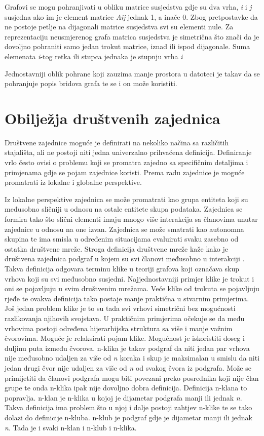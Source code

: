 Grafovi se mogu pohranjivati u obliku matrice susjedstva gdje su dva vrha, \textit{i} i \textit{j} susjedna ako im je element matrice \textit{A{ij}} jednak 1, a inače 0. Zbog pretpostavke da ne postoje petlje na dijagonali matrice susjedstva svi su elementi nule. Za reprezentaciju neusmjerenog grafa matrica susjedstva je simetrična što znači da je dovoljno pohraniti samo jedan trokut matrice, iznad ili ispod dijagonale. Suma elemenata \textit{i}-tog retka ili stupca jednaka je stupnju vrha \textit{i}

Jednostavniji oblik pohrane koji zauzima manje prostora u datoteci je takav da se pohranjuje popis bridova grafa te se i on može koristiti.


\section{Obilježja društvenih zajednica} 

Društvene zajednice moguće je definirati na nekoliko načina sa različitih stajališta, ali ne postoji niti jedna univerzalno prihvaćena definicija. Definiranje vrlo često ovisi o problemu koji se promatra zajedno sa specifičnim detaljima i primjenama gdje se pojam zajednice koristi. Prema radu \cite{fortunato2010community} zajednice je moguće promatrati iz lokalne i globalne perspektive.

Iz lokalne perspektive zajednica se može promatrati kao grupa entiteta koji su međusobno sličniji u odnosu na ostale entitete skupa podataka. Zajednica se formira tako što slični elementi imaju mnogo više interakcija sa članovima unutar zajednice u odnosu na one izvan. Zajednica se može smatrati kao autonomna skupina te ima smisla u određenim situacijama evaluirati svaku zasebno od ostatka društvene mreže. Stroga definicija društvene mreže kaže kako je društvena zajednica podgraf u kojem su svi članovi međusobno u interakciji \cite{luce1949method}. Takva definicija odgovara terminu klike u teoriji grafova koji označava skup vrhova koji su svi međusobno susjedni. Najjednostavniji primjer klike je trokut i oni se pojavljuju u svim društvenim mrežama. Veće klike od trokuta se pojavljuju rjeđe te ovakva definicija tako postaje manje praktična u stvarnim primjerima. Još jedan problem klike je to su tada svi vrhovi simetrični bez mogućnosti razlikovanja njihovih svojstava. U praktičnim primjerima očekuje se da među vrhovima postoji određena hijerarhijska struktura sa više i manje važnim čvorovima. Moguće je relaksirati pojam klike. Mogućnost je iskoristiti doseg i duljinu puta između čvorova. n-klika je takav podgraf da niti jedan par vrhova nije međusobno udaljen za više od \textit{n} koraka i skup je maksimalan u smislu da niti jedan drugi čvor nije udaljen za više od \textit{n} od svakog čvora iz podgrafa. Može se primijetiti da članovi podgrafa mogu biti povezani preko posrednika koji nije član grupe te onda n-klika ipak nije dovoljno dobra definicija. Definicija n-klana to popravlja. n-klan je n-klika u kojoj je dijametar podgrafa manji ili jednak \textit{n}. Takva definicija ima problem što u njoj i dalje postoji zahtjev n-klike te se tako dolazi do definicije n-kluba. n-klub je podgraf gdje je dijametar manji ili jednak \textit{n}. Tada je i svaki n-klan i n-klub i n-klika.

